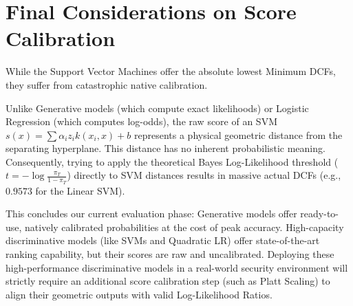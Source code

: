 \section{Final Considerations on Score Calibration}

While the Support Vector Machines offer the absolute lowest Minimum DCFs, they suffer from catastrophic native calibration. 

Unlike Generative models (which compute exact likelihoods) or Logistic Regression (which computes log-odds), the raw score of an SVM $s(x) = \sum \alpha_i z_i k(x_i, x) + b$ represents a physical geometric distance from the separating hyperplane. This distance has no inherent probabilistic meaning. Consequently, trying to apply the theoretical Bayes Log-Likelihood threshold ($t = -\log \frac{\pi_T}{1-\pi_T}$) directly to SVM distances results in massive actual DCFs (e.g., $0.9573$ for the Linear SVM). 

This concludes our current evaluation phase: Generative models offer ready-to-use, natively calibrated probabilities at the cost of peak accuracy. High-capacity discriminative models (like SVMs and Quadratic LR) offer state-of-the-art ranking capability, but their scores are raw and uncalibrated. Deploying these high-performance discriminative models in a real-world security environment will strictly require an additional score calibration step (such as Platt Scaling) to align their geometric outputs with valid Log-Likelihood Ratios.